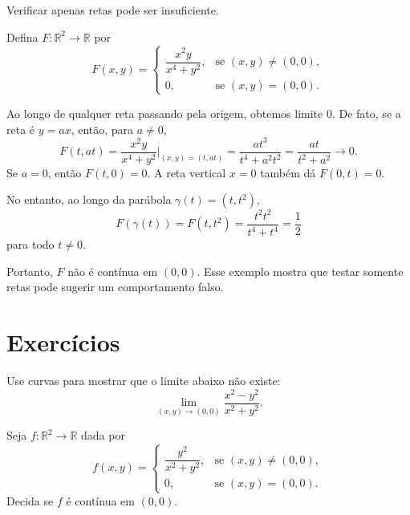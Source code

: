 \begin{example}
    Verificar apenas retas pode ser insuficiente.

    Defina $F:\mathbb R^2\to\mathbb R$ por
    \[
        F(x,y)=
        \begin{cases}
            \dfrac{x^2y}{x^4+y^2}, & \text{se }(x,y)\neq(0,0),\\
            0, & \text{se }(x,y)=(0,0).
        \end{cases}
    \]

    Ao longo de qualquer reta passando pela origem, obtemos limite $0$.
    De fato, se a reta é $y=ax$, então, para $a\neq 0$,
    \[
        F(t,at)
        =
        \frac{x^2y}{x^4+y^2}\bigg|_{(x,y)=(t,at)}
        =
        \frac{at^3}{t^4+a^2t^2}
        =
        \frac{at}{t^2+a^2}
        \longrightarrow 0.
    \]
    Se $a=0$, então $F(t,0)=0$.
    A reta vertical $x=0$ também dá $F(0,t)=0$.

    No entanto, ao longo da parábola $\gamma(t)=(t,t^2)$,
    \[
        F(\gamma(t))
        =
        F(t,t^2)
        =
        \frac{t^2t^2}{t^4+t^4}
        =
        \frac{1}{2}
    \]
    para todo $t\neq 0$.

    Portanto, $F$ não é contínua em $(0,0)$.
    Esse exemplo mostra que testar somente retas pode sugerir um comportamento falso.
\end{example}

\section*{Exercícios}

\begin{exercise}
    Use curvas para mostrar que o limite abaixo não existe:
    \[
        \lim_{(x,y)\to(0,0)}\frac{x^2-y^2}{x^2+y^2}.
    \]
\end{exercise}

\begin{exercise}
    Seja $f:\mathbb R^2\to\mathbb R$ dada por
    \[
        f(x,y)=
        \begin{cases}
            \dfrac{y^2}{x^2+y^2}, & \text{se }(x,y)\neq(0,0),\\
            0, & \text{se }(x,y)=(0,0).
        \end{cases}
    \]
    Decida se $f$ é contínua em $(0,0)$.
\end{exercise}